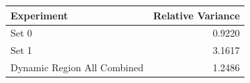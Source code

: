 \begin{tabular}{lr}
\toprule
Experiment & Relative Variance \\
\midrule
Set 0 & 0.9220 \\
Set 1 & 3.1617 \\
Dynamic Region All Combined & 1.2486 \\
\bottomrule
\end{tabular}

